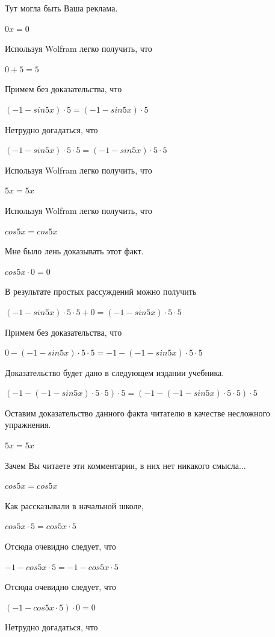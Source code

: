 \documentclass[12pt,a4paper,fleqn]{article}
\theoremstyle{definition}
\begin{document}
Тут могла быть Ваша реклама. 

$ 0  x  =  0 $

Используя Wolfram легко получить, что 

$ 0  +  5  =  5 $

Примем без доказательства, что 

$( -1  - sin 5  x ) \cdot  5  = ( -1  - sin 5  x ) \cdot  5 $

Нетрудно догадаться, что 

$( -1  - sin 5  x ) \cdot  5  \cdot  5  = ( -1  - sin 5  x ) \cdot  5  \cdot  5 $

Используя Wolfram легко получить, что 

$ 5  x  =  5  x $

Используя Wolfram легко получить, что 

$cos 5  x  = cos 5  x $

Мне было лень доказывать этот факт.

$cos 5  x  \cdot  0  =  0 $

В результате простых рассуждений можно получить 

$( -1  - sin 5  x ) \cdot  5  \cdot  5  +  0  = ( -1  - sin 5  x ) \cdot  5  \cdot  5 $

Примем без доказательства, что 

$ 0  - ( -1  - sin 5  x ) \cdot  5  \cdot  5  =  -1  - ( -1  - sin 5  x ) \cdot  5  \cdot  5 $

Доказательство будет дано в следующем издании учебника. 

$( -1  - ( -1  - sin 5  x ) \cdot  5  \cdot  5 ) \cdot  5  = ( -1  - ( -1  - sin 5  x ) \cdot  5  \cdot  5 ) \cdot  5 $

Оставим доказательство данного факта читателю в качестве несложного упражнения. 

$ 5  x  =  5  x $

Зачем Вы читаете эти комментарии, в них нет никакого смысла... 

$cos 5  x  = cos 5  x $

Как рассказывали в начальной школе, 

$cos 5  x  \cdot  5  = cos 5  x  \cdot  5 $

Отсюда очевидно следует, что 

$ -1  - cos 5  x  \cdot  5  =  -1  - cos 5  x  \cdot  5 $

Отсюда очевидно следует, что 

$( -1  - cos 5  x  \cdot  5 ) \cdot  0  =  0 $

Нетрудно догадаться, что 
\end{document}
